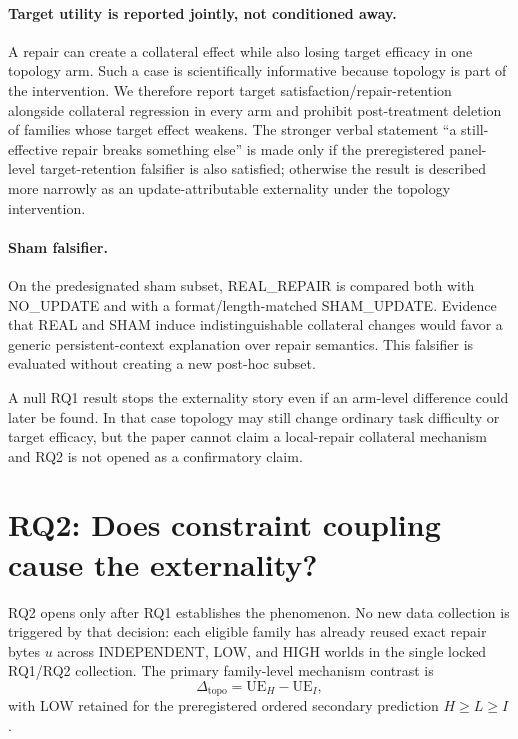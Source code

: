 \documentclass{article}
\begin{document}
\paragraph{Target utility is reported jointly, not conditioned away.}
A repair can create a collateral effect while also losing target efficacy in one topology arm. Such a case is scientifically informative because topology is part of the intervention. We therefore report target satisfaction/repair-retention alongside collateral regression in every arm and prohibit post-treatment deletion of families whose target effect weakens. The stronger verbal statement ``a still-effective repair breaks something else'' is made only if the preregistered panel-level target-retention falsifier is also satisfied; otherwise the result is described more narrowly as an update-attributable externality under the topology intervention.

\paragraph{Sham falsifier.}
On the predesignated sham subset, REAL\_REPAIR is compared both with NO\_UPDATE and with a format/length-matched SHAM\_UPDATE. Evidence that REAL and SHAM induce indistinguishable collateral changes would favor a generic persistent-context explanation over repair semantics. This falsifier is evaluated without creating a new post-hoc subset.

A null RQ1 result stops the externality story even if an arm-level difference could later be found. In that case topology may still change ordinary task difficulty or target efficacy, but the paper cannot claim a local-repair collateral mechanism and RQ2 is not opened as a confirmatory claim.

\section{RQ2: Does constraint coupling cause the externality?}
\label{sec:rq2}
RQ2 opens only after RQ1 establishes the phenomenon. No new data collection is triggered by that decision: each eligible family has already reused exact repair bytes $u$ across INDEPENDENT, LOW, and HIGH worlds in the single locked RQ1/RQ2 collection. The primary family-level mechanism contrast is
\begin{equation}
\Delta_{\mathrm{topo}}=\mathrm{UE}_{H}-\mathrm{UE}_{I},
\end{equation}
with LOW retained for the preregistered ordered secondary prediction $H\ge L\ge I$.
\end{document}
